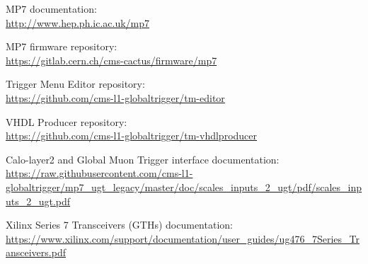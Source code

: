 \documentclass[11pt,a4paper,english,titlepage]{article}
\begin{document}
\doctitlepage{}



\doctoc{}

%
% 


% 
% 



% 
% 
% 




\doctables{}

\docfigures{}

% 

\clearpage

\begin{thebibliography}{00}

MP7 documentation:\\
\url{http://www.hep.ph.ic.ac.uk/mp7}

MP7 firmware repository:\\
\url{https://gitlab.cern.ch/cms-cactus/firmware/mp7}

Trigger Menu Editor repository:\\
\url{https://github.com/cms-l1-globaltrigger/tm-editor}

VHDL Producer repository:\\
\url{https://github.com/cms-l1-globaltrigger/tm-vhdlproducer}


Calo-layer2 and Global Muon Trigger interface documentation:\\
\url{https://raw.githubusercontent.com/cms-l1-globaltrigger/mp7_ugt_legacy/master/doc/scales_inputs_2_ugt/pdf/scales_inputs_2_ugt.pdf}

Xilinx Series 7 Transceivers (GTHs) documentation:\\
\url{https://www.xilinx.com/support/documentation/user_guides/ug476_7Series_Transceivers.pdf}

\end{thebibliography}


\end{document}
